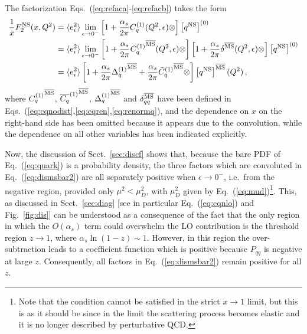 The factorization Eqs.~(\ref{eq:refaca}-\ref{eq:refacb}) takes the
form
\begin{align}
  \frac{1}{x} F_2^{{\textrm{NS}}}(x,Q^2)&= \langle e_i^2\rangle
\lim_{\epsilon\to
  0^-}\left[1
    +\frac{\alpha_s}{2\pi} C_{q}^{(1)}(Q^2,\epsilon) \otimes \right] 
    \left[{q^{{\textrm{NS}}}}\right]^{(0)} \label{eq:dismsbar} \\
&= \langle e_i^2\rangle
\lim_{\epsilon\to
  0^-}\left[1
  +\frac{\alpha_s}{2\pi} {C_{q}^{(1)}}^{{\overline{\textrm{{MS}}}}}(Q^2, \epsilon) \otimes \right] 
\left[1
    +\frac{\alpha_s}{2\pi} \delta^{{\overline{\textrm{{MS}}}}} (Q^2,\epsilon) \otimes \right]
     \left[{q^{{\textrm{NS}}}}\right]^{(0)} \label{eq:dismsbar1} \\
    &=  \langle e_i^2\rangle
\left[1+ \frac{\alpha_s}{2\pi} {\Delta^{(1)}_q}^{{\overline{\textrm{{MS}}}}}
  +\frac{\alpha_s}{2\pi}    {\bar{C}_{q}^{(1)}{}}^{{\overline{\textrm{{MS}}}}} \otimes
  \right] 
     \left[{q^{{\textrm{NS}}}}\right]^{{\overline{\textrm{{MS}}}}}(Q^2) \,, \label{eq:dismsbar2}
\end{align}
where $ {C_{q}^{(1)}}^{{\overline{\textrm{{MS}}}}}$,  ${\overline{C_{q}}^{(1)}}^{{\overline{\textrm{{MS}}}}}$,
${\Delta^{(1)}_q}^{{\overline{\textrm{{MS}}}}}$ and $ \delta_{qq}^{{\overline{\textrm{{MS}}}}} $ have been
defined in Eqs.~(\ref{eq:cqnodist},\ref{eq:cqren},\ref{eq:renormq}),
and the dependence on $x$ on the  right-hand side has been omitted
because it appears due to the convolution, while the dependence on all
other variables has been indicated explicitly.

Now, the discussion of Sect.~\ref{sec:discf} shows that, because the
bare PDF of Eq.~(\ref{eq:quark}) is a probability density, the three
factors which are convoluted in Eq.~(\ref{eq:dismsbar2}) are all
separately positive when $\epsilon \to 0^-$, i.e.\ from the negative
region, provided only $\mu^2< \mu_D^2$, with $\mu_D^2$ given by
Eq.~(\ref{eq:mud})\footnote{Note that the condition cannot be satisfied in
the strict $x\to1$ limit, but this is as it should be since in the
limit the scattering process becomes elastic and it is no longer
described by perturbative QCD.}.
This, as discussed in Sect.~\ref{sec:diag} [see in particular
Eq.~(\ref{eq:cqnlo}) and Fig.~\ref{fig:dis}]
can be understood as a consequence of the fact that the only region in
which the $O(\alpha_s)$ term could overwhelm the LO contribution is
the threshold region $z\to 1$, where $\alpha_s\ln(1-z)\sim1$.
However, in this region the \msbar{} over-subtraction leads to a
coefficient function which is positive because $P_{qq}$ is negative at
large $z$. Consequently, all factors in  Eq.~(\ref{eq:dismsbar2})
remain positive for all $z$.

